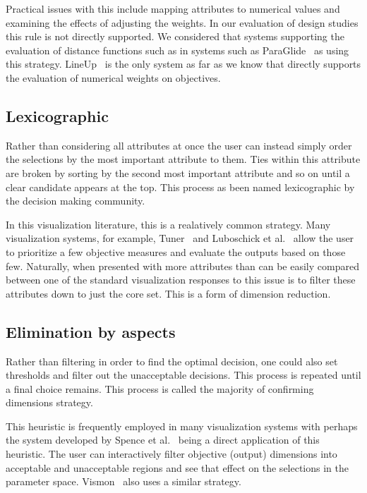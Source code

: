 Practical issues with this include mapping attributes to numerical values
and examining the effects of adjusting the weights. In our evaluation of
design studies this rule is not directly supported. We considered that
systems supporting the evaluation of distance functions such as 
in systems such as ParaGlide~\citep{Bergner:2013} as using this strategy.
LineUp~\citep{Gratzl:2013} is the only system as far as we know that
directly supports the evaluation of numerical weights on objectives.

\subsection{Lexicographic}\label{lexicographic}

Rather than considering all attributes at once the user can instead simply
order the selections by the most important attribute to them. Ties within this
attribute are broken by sorting by the second most important attribute and so
on until a clear candidate appears at the top. This process as been named
lexicographic by the decision making community.

In this visualization literature, this is a realatively common strategy.
Many visualization systems, for example, Tuner~\cite{Torsney-Weir:2011} and
Luboschick et al.~\citep{Luboschik:2014} allow the user to prioritize a few
objective measures and evaluate the outputs based on those few. Naturally,
when presented with more attributes than can be easily compared between
one of the standard visualization responses to this issue is to filter
these attributes down to just the core set. This is a form of dimension 
reduction.

\subsection{Elimination by aspects}\label{elimination-by-aspects}

Rather than filtering in order to find the optimal decision, one could
also set thresholds and filter out the unacceptable decisions. This process
is repeated until a final choice remains. This process is called
the majority of confirming dimensions strategy. 

This heuristic is frequently employed in many visualization systems with
perhaps the system developed by Spence et al.~\citep{Spence:1995} being a
direct application of this heuristic. The user can interactively filter
objective (output) dimensions into acceptable and unacceptable regions and
see that effect on the selections in the parameter space. 
Vismon~\citep{Booshehrian:2012} also uses a similar strategy.

